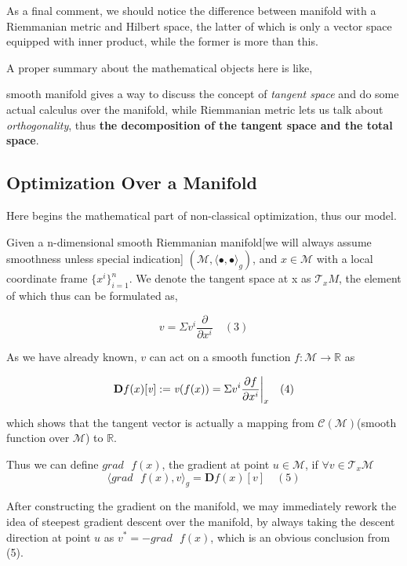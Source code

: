 \documentclass[letterpaper]{article}
\begin{document}
As a final comment, we should notice the difference between manifold with a Riemmanian metric and Hilbert space, the latter of which is only a vector space equipped with inner product, while the former is more
than this.

A proper summary about the mathematical objects here is like,

smooth manifold gives a way to discuss the concept of \textit{tangent space} and do some actual calculus over the manifold, while Riemmanian metric lets us
talk about \textit{orthogonality}, thus \textbf{the decomposition of the tangent space and the total space}.



\subsection{Optimization Over a Manifold}
Here begins the mathematical part of non-classical optimization, thus our model.

Given a n-dimensional smooth Riemmanian manifold[we will always assume smoothness unless special indication] $(\mathcal{M}, \langle\bullet,\bullet\rangle_g)$,
and $x\in\mathcal{M}$ with a local coordinate frame $\{x^i\}_{i=1}^n$. We denote the tangent space at x as $\mathcal{T}_x{M}$, the element of which
thus can be formulated as,

$$
  \mathit{v} = \Sigma\mathit{v}^i\frac{\partial}{\partial{x^i}} \quad (3)
$$

As we have already known, $\mathit{v}$ can act on a smooth function $f:\mathcal{M}\to\mathbb{R}$ as

$$
  \mathbf{D}f(x)[\mathit{v}]:=\mathit{v}(f(x))=\Sigma{v^i\frac{\partial{f}}{\partial{x^i}}\bigg{|}_x} \quad (4)
$$

which shows that the tangent vector is actually a mapping from $\mathcal{C}(\mathcal{M})$(smooth function over $\mathcal{M}$) to $\mathbb{R}$.

Thus we can define $grad \text{ } f(x)$, the gradient at point $u\in\mathcal{M}$,
if $\forall \mathit{v}\in\mathcal{T}_x\mathcal{M}$
$$
   \langle{}grad \text{ } f(x), \mathit{v}\rangle_g = \mathbf{D}f(x)[\mathit{v}] \quad (5)
$$

After constructing the gradient on the manifold, we may immediately rework the idea of steepest gradient descent over the manifold,
by always taking the descent direction at point $u$ as $\mathit{v}^{*}=-grad\text{ }f(x)$, which is an obvious conclusion from (5).
\end{document}
